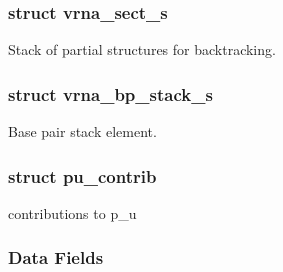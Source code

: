 \subsubsection{struct vrna\+\_\+sect\+\_\+s}
Stack of partial structures for backtracking. \label{structvrna__bp__stack__s}
\hypertarget{group__data__structures_structvrna__bp__stack__s}{}
\subsubsection{struct vrna\+\_\+bp\+\_\+stack\+\_\+s}
Base pair stack element. \label{structpu__contrib}
\hypertarget{group__data__structures_structpu__contrib}{}
\subsubsection{struct pu\+\_\+contrib}
contributions to p\+\_\+u \subsubsection*{Data Fields}
